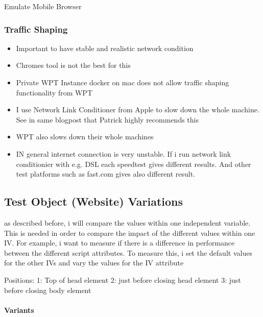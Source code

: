 Emulate Mobile Browser



\subsubsection{Traffic Shaping}

\begin{itemize}
\item Important to have stable and realistic network condition
\item Chromes tool is not the best for this %
\item Private WPT Instance docker on mac does not allow traffic shaping functionality from WPT
\item I use Network Link Conditioner from Apple to slow down the whole machine. See in same blogpost that Patrick highly recommends this
\item WPT also slows down their whole machines %
\item IN general internet connection is very unstable. If i run network link conditionier with e.g. DSL each speedtest gives different results. And other test platforms such as fast.com gives also different result.
\end{itemize}








\subsection{Test Object (Website) Variations}

as described before, i will compare the values within one independent variable. 
This is needed in order to compare the impact of the different values within one IV.
For example, i want to measure if there is a difference in performance between the different script attributes. To measure this, i set the default values for the other IVs and vary the values for the IV attribute

Positions:
1: Top of head element
2: just before closing head element
3: just before closing body element


\paragraph{Variants}


